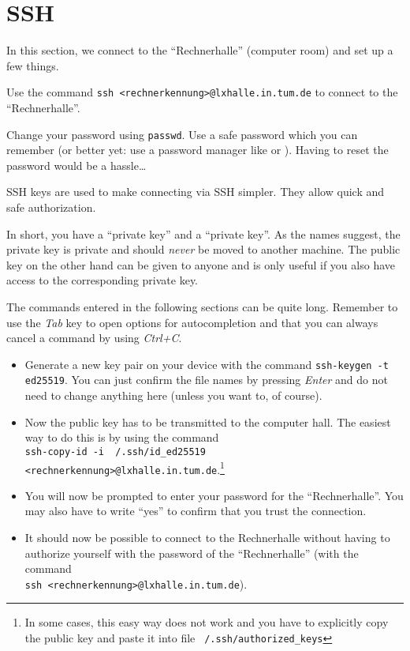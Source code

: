 \documentclass[english]{sheet}
\begin{document}
\section{SSH}
In this section, we connect to the ``Rechnerhalle'' (computer room) and set up a few things.

\begin{exercise}[subtitle=Establishing a Connection]
    Use the command \texttt{ssh <rechnerkennung>@lxhalle.in.tum.de} to connect to the ``Rechnerhalle''.
\end{exercise}

\begin{exercise}[subtitle=(*) Change Password]
    Change your password using \texttt{passwd}. Use a safe password which you can remember (or
    better yet: use a password manager like  or ). Having to reset the password would be a hassle\ldots
\end{exercise}

\begin{exercise}[subtitle=SSH-Keys]
    SSH keys are used to make connecting via SSH simpler. They allow quick and safe authorization.

    In short, you have a ``private key'' and a ``private key''. As the names suggest, the private key is private and should \emph{never} be moved to another machine. The public key on the other hand can be given to anyone and is only useful if you also have access to the corresponding private key.

    The commands entered in the following sections can be quite long. Remember to use the \emph{Tab} key to open options for autocompletion and that you can always cancel a command by using \emph{Ctrl+C}.

    \begin{itemize}
        \item Generate a new key pair on your device with the command \texttt{ssh-keygen -t ed25519}. You can just confirm the file names by pressing \emph{Enter} and do not need to change anything here (unless you want to, of course).
        \item Now the public key has to be transmitted to the computer hall. The easiest
        way to do this is by using the command\\\texttt{ssh-copy-id -i ~/.ssh/id\_ed25519 <rechnerkennung>@lxhalle.in.tum.de}.\footnote{In some cases, this easy way does not work and you have to explicitly copy the public key and paste it into file \texttt{~/.ssh/authorized_keys}}
        \item You will now be prompted to enter your password for the ``Rechnerhalle''. You may also have to write ``yes'' to confirm that you trust the connection.
        \item It should now be possible to connect to the Rechnerhalle without having to authorize yourself with the password of the ``Rechnerhalle'' (with the command\\\texttt{ssh <rechnerkennung>@lxhalle.in.tum.de}).
    \end{itemize}
\end{exercise}
\end{document}
